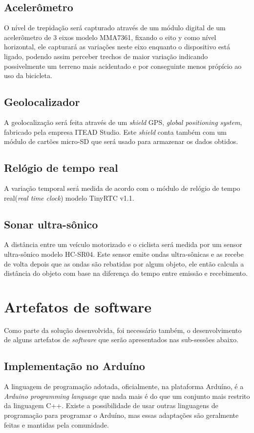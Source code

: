 \documentclass[final,12pt, times, 5p, twocolumn]{elsarticle}
\begin{document}
\subsection{Acelerômetro}
O nível de trepidação será capturado através de um módulo digital de um acelerômetro de 3 eixos modelo MMA7361, fixando o eito y como nível horizontal, ele capturará as variações neste eixo enquanto o dispositivo está ligado, podendo assim perceber trechos de maior variação indicando possivelmente um terreno mais acidentado e por conseguinte menos própício ao uso da bicicleta.

\subsection{Geolocalizador}
A geolocalização será feita através de um \textit{shield} GPS, \textit{global positioning system}, fabricado pela empresa ITEAD Studio. Este \textit{shield} conta também com um módulo de cartões micro-SD que será usado para armazenar os dados obtidos.

\subsection{Relógio de tempo real}
A variação temporal será medida de acordo com o módulo de relógio de tempo real(\textit{real time clock}) modelo TinyRTC v1.1.

\subsection{Sonar ultra-sônico}
A distância entre um veículo motorizado e o ciclista será medida por um sensor ultra-sônico modelo HC-SR04. Este sensor emite ondas ultra-sônicas e as recebe de volta depois que as ondas são rebatidas por algum objeto, ele então calcula a distância do objeto com base na diferença do tempo entre emissão e recebimento.

\section{Artefatos de software}
Como parte da solução desenvolvida, foi necessário também, o desenvolvimento de alguns artefatos de \textit{software} que serão apresentados nas sub-sessões abaixo.

\subsection{Implementação no Arduíno}
A linguagem de programação adotada, oficialmente, na plataforma Arduíno, é a \textit{Arduino programming language}\cite{arduinopl} que nada mais é do que um conjunto mais restrito da linguagem C++. Existe a possibilidade de usar outras linguagens de programação para programar o Arduíno, mas essas adaptações são geralmente feitas e mantidas pela comunidade. 
\end{document}
